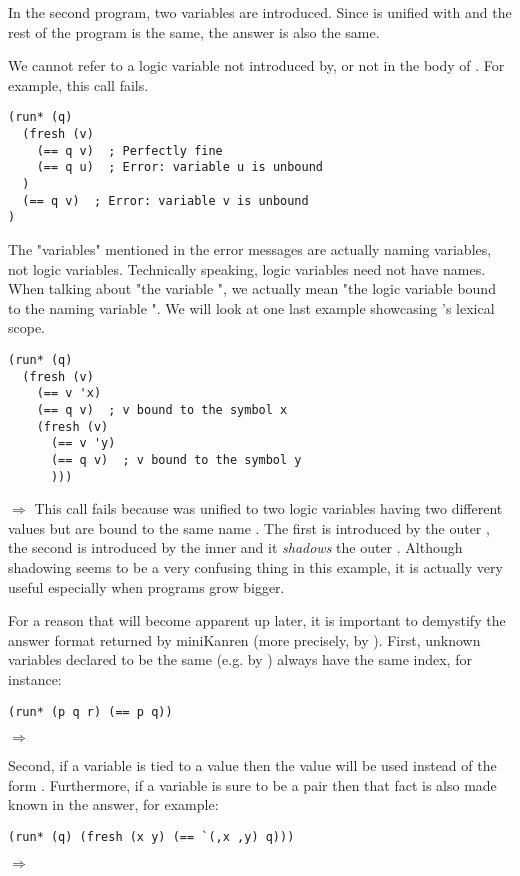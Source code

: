 In the second program, two variables are introduced. Since  is unified with  and the rest of the program is the same, the answer is also the same.

We cannot refer to a logic variable not introduced by, or not in the body of . For example, this call fails.
\begin{lstlisting}
(run* (q)
  (fresh (v)
    (== q v)  ; Perfectly fine
    (== q u)  ; Error: variable u is unbound
  )
  (== q v)  ; Error: variable v is unbound
)
\end{lstlisting}
The "variables" mentioned in the error messages are actually naming variables, not logic variables. Technically speaking, logic variables need not have names. When talking about "the variable ", we actually mean "the logic variable bound to the naming variable ". We will look at one last example showcasing 's lexical scope.
\begin{lstlisting}
(run* (q)
  (fresh (v)
    (== v 'x)
    (== q v)  ; v bound to the symbol x
    (fresh (v)
      (== v 'y)
      (== q v)  ; v bound to the symbol y
      )))
\end{lstlisting}
$\Rightarrow$ \code{()}
This call fails because  was unified to two logic variables having two different values but are bound to the same name . The first  is introduced by the outer , the second  is introduced by the inner  and it \textit{shadows} the outer . Although shadowing seems to be a very confusing thing in this example, it is actually very useful especially when programs grow bigger.

For a reason that will become apparent up later, it is important to demystify the answer format returned by miniKanren (more precisely, by ). First, unknown variables declared to be the same (e.g. by \code{==}) always have the same index, for instance:
\begin{lstlisting}
(run* (p q r) (== p q))
\end{lstlisting}
$\Rightarrow$ 

Second, if a variable is tied to a value then the value will be used instead of the form . Furthermore, if a variable is sure to be a pair then that fact is also made known in the answer, for example:
\begin{lstlisting}
(run* (q) (fresh (x y) (== `(,x ,y) q)))
\end{lstlisting}
$\Rightarrow$ 

